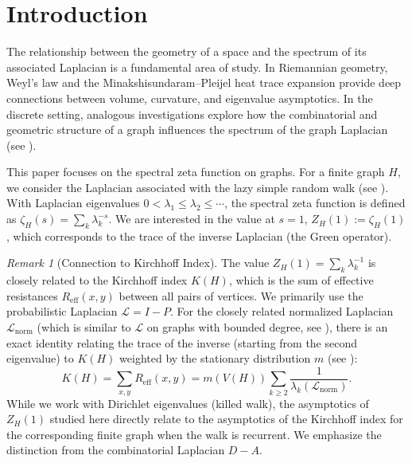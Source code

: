 \documentclass{article}
\numberwithin{equation}{section}
\theoremstyle{definition}
\theoremstyle{remark}
\newtheorem{remark}[theorem]{Remark}
\newcommand{\LL}{\mathcal{L}}
\newcommand{\Reff}{R_{\mathrm{eff}}}
\begin{document}
\maketitle
\section{Introduction}

The relationship between the geometry of a space and the spectrum of its associated Laplacian is a fundamental area of study. In Riemannian geometry, Weyl's law and the Minakshisundaram--Pleijel heat trace expansion provide deep connections between volume, curvature, and eigenvalue asymptotics. In the discrete setting, analogous investigations explore how the combinatorial and geometric structure of a graph influences the spectrum of the graph Laplacian (see \cite{Chung97}).

This paper focuses on the spectral zeta function on graphs. For a finite graph $H$, we consider the Laplacian associated with the lazy simple random walk (see ). With Laplacian eigenvalues $0 < \lambda_1 \leq \lambda_2 \leq \cdots$, the spectral zeta function is defined as $\zeta_H(s) = \sum_k \lambda_k^{-s}$. We are interested in the value at $s=1$, $Z_H(1) := \zeta_H(1)$, which corresponds to the trace of the inverse Laplacian (the Green operator).

\begin{remark}[Connection to Kirchhoff Index]\label{rem:kirchhoff}
The value $Z_H(1) = \sum_k \lambda_k^{-1}$ is closely related to the Kirchhoff index $K(H)$, which is the sum of effective resistances $\Reff(x,y)$ between all pairs of vertices.
We primarily use the probabilistic Laplacian $\LL=I-P$. For the closely related normalized Laplacian $\LL_{\text{norm}}$ (which is similar to $\LL$ on graphs with bounded degree, see ), there is an exact identity relating the trace of the inverse (starting from the second eigenvalue) to $K(H)$ weighted by the stationary distribution $m$ (see \cite[Chapter 9]{LyonsPeres16}):
\[
K(H) = \sum_{x,y} \Reff(x,y) = m(V(H)) \sum_{k \ge 2} \frac{1}{\lambda_k(\LL_{\text{norm}})}.
\]
While we work with Dirichlet eigenvalues (killed walk), the asymptotics of $Z_H(1)$ studied here directly relate to the asymptotics of the Kirchhoff index for the corresponding finite graph when the walk is recurrent. We emphasize the distinction from the combinatorial Laplacian $D-A$.
\end{remark}
\end{document}
